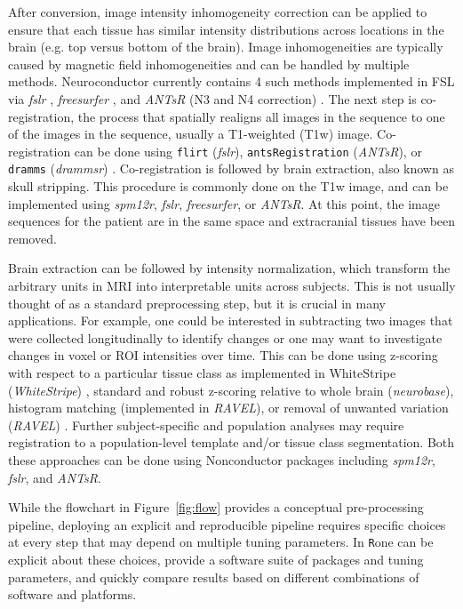 \documentclass[]{elsarticle} %
\newcommand{\code}[1]{\texttt{#1}}
\newcommand{\pkg}[1]{\emph{#1}}
\newcommand{\rlang}{\texttt{R}}
\begin{document}
After conversion, image intensity inhomogeneity correction can be applied to ensure that each tissue has similar intensity distributions across locations in the brain (e.g. top versus bottom of the brain). Image inhomogeneities are typically caused by magnetic field inhomogeneities and can be handled by multiple methods. Neuroconductor currently contains 4 such methods implemented in FSL via \pkg{fslr} \cite{zhang_segmentation_2001},  \pkg{freesurfer} \cite{sled_nonparametric_1998}, and \pkg{ANTsR} (N3 and N4 correction) \cite{sled_nonparametric_1998,tustison_n4itk:_2010}.  The next step is co-registration, the process that spatially realigns all images in the sequence to one of the images in the sequence, usually a T1-weighted (T1w) image.  Co-registration can be done using \code{flirt} (\pkg{fslr}), \code{antsRegistration} (\pkg{ANTsR}), or \code{dramms} (\pkg{drammsr}) \cite{dramms}. Co-registration is followed by brain extraction, also known as skull stripping.  This procedure is commonly done on the T1w image, and can be implemented using \pkg{spm12r}, \pkg{fslr}, \pkg{freesurfer}, or \pkg{ANTsR}. At this point, the image sequences for the patient are in the same space and extracranial tissues have been removed.

Brain extraction can be followed by intensity normalization,  which transform the arbitrary units in MRI into interpretable units across subjects. This is not usually thought of as a standard preprocessing step, but it is crucial in many applications. For example, one could be interested in subtracting two images that were collected longitudinally to identify changes or one may want to investigate changes in voxel or ROI intensities over time.  This can be done using z-scoring with respect to a particular tissue class as implemented in WhiteStripe (\pkg{WhiteStripe}) \citep{whitestripe}, standard and robust z-scoring relative to whole brain (\pkg{neurobase}), histogram matching (implemented in \pkg{RAVEL}), or removal of unwanted variation (\pkg{RAVEL}) \citep{ravel}.  Further subject-specific and population analyses may require registration to a population-level template and/or tissue class segmentation. Both these approaches can be done using Nonconductor packages including \pkg{spm12r}, \pkg{fslr}, and \pkg{ANTsR}.

While the flowchart in Figure~\ref{fig:flow} provides a conceptual pre-processing pipeline, deploying an explicit and reproducible pipeline requires specific choices at every step that may depend on multiple tuning parameters. In \rlang one can be explicit about these choices, provide a software suite of packages and tuning parameters, and quickly compare results based on different combinations of software and platforms.  
\end{document}
